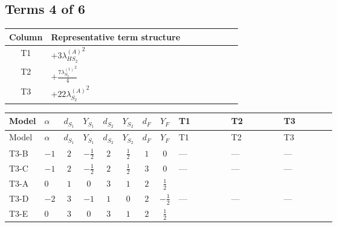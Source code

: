 \documentclass[8pt]{article}
\begin{document}
\begin{landscape}
\subsection*{Terms 4 of 6}
\begin{center}
\begin{tabular}{@{}c >{\raggedright\arraybackslash}p{0.82\linewidth}@{}}
\toprule
Column & Representative term structure \\
\midrule
T1 & \(\displaystyle +3 {\lambda_{HS_2}^{(A)}}^2\) \\
\midrule
T2 & \(\displaystyle +\frac{7 {\lambda_{S_2}^{(1)}}^2}{4}\) \\
\midrule
T3 & \(\displaystyle +22 {\lambda_{S_2}^{(A)}}^2\) \\
\midrule
\bottomrule
\end{tabular}
\end{center}
\smallskip
\tiny
\begin{longtable}{@{}llcccccc >{\raggedright\arraybackslash}p{0.21\linewidth} >{\raggedright\arraybackslash}p{0.21\linewidth} >{\raggedright\arraybackslash}p{0.21\linewidth}@{}}
\toprule
Model & $\alpha$ & $d_{S_1}$ & $Y_{S_1}$ & $d_{S_2}$ & $Y_{S_2}$ & $d_F$ & $Y_F$ & T1 & T2 & T3 \\
\midrule
\endfirsthead
\toprule
Model & $\alpha$ & $d_{S_1}$ & $Y_{S_1}$ & $d_{S_2}$ & $Y_{S_2}$ & $d_F$ & $Y_F$ & T1 & T2 & T3 \\
\midrule
\endhead
T3-B & $-1$ & $2$ & $-\frac{1}{2}$ & $2$ & $\frac{1}{2}$ & $1$ & $0$ & --- & --- & --- \\
\midrule
T3-C & $-1$ & $2$ & $-\frac{1}{2}$ & $2$ & $\frac{1}{2}$ & $3$ & $0$ & --- & --- & --- \\
\midrule
T3-A & $0$ & $1$ & $0$ & $3$ & $1$ & $2$ & $\frac{1}{2}$ & \scriptsize\adjustbox{max width=\linewidth}{$\begin{gathered} +3 {\lambda_{HS_2}^{(A)}}^2\end{gathered}$} & \scriptsize\adjustbox{max width=\linewidth}{$\begin{gathered} +\frac{7 {\lambda_{S_2}^{(1)}}^2}{4}\end{gathered}$} & \scriptsize\adjustbox{max width=\linewidth}{$\begin{gathered} +22 {\lambda_{S_2}^{(A)}}^2\end{gathered}$} \\
\midrule
T3-D & $-2$ & $3$ & $-1$ & $1$ & $0$ & $2$ & $-\frac{1}{2}$ & --- & --- & --- \\
\midrule
T3-E & $0$ & $3$ & $0$ & $3$ & $1$ & $2$ & $\frac{1}{2}$ & \scriptsize\adjustbox{max width=\linewidth}{$\begin{gathered} +3 {\lambda_{HS_2}^{(A)}}^2\end{gathered}$} & \scriptsize\adjustbox{max width=\linewidth}{$\begin{gathered} +\frac{7 {\lambda_{S_2}^{(1)}}^2}{4}\end{gathered}$} & \scriptsize\adjustbox{max width=\linewidth}{$\begin{gathered} +22 {\lambda_{S_2}^{(A)}}^2\end{gathered}$} \\

\end{longtable}
\end{landscape}
\end{document}
